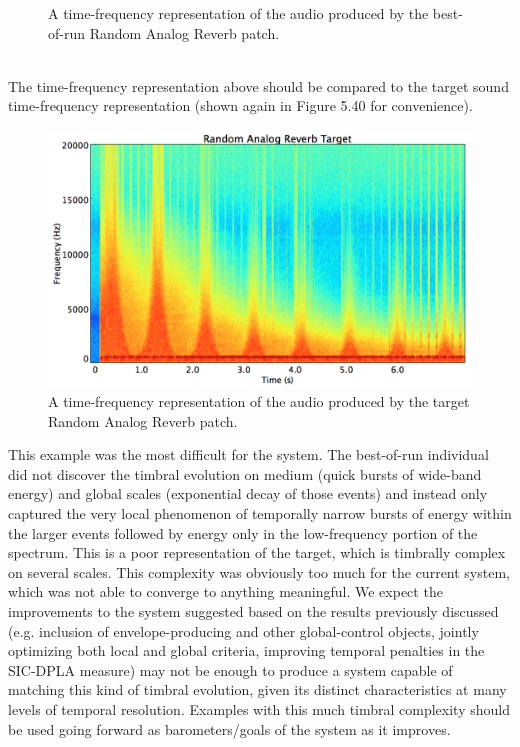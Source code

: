 \documentclass[12pt]{report} 	%
\numberwithin{figure}{chapter}
\numberwithin{table}{chapter}
\numberwithin{equation}{chapter}
\begin{document}
\begin{flushleft}
\begin{figure}[h!]
\begin{center}
\caption[Best-of-run random analog reverb time-frequency representation]{A time-frequency representation of the audio produced by the best-of-run Random Analog Reverb patch.}
\end{center}
\end{figure}
\\
The time-frequency representation above should be compared to the target sound time-frequency representation (shown again in Figure 5.40 for convenience).
\begin{figure}[h!]
\begin{center}
\includegraphics[scale=0.35,width=\linewidth]{RandomAnalogReverbTargetSTFT}
\caption[Target random analog reverb time-frequency representation]{A time-frequency representation of the audio produced by the target Random Analog Reverb patch.}
\end{center}
\end{figure}
This example was the most difficult for the system. The best-of-run individual did not discover the timbral evolution on medium (quick bursts of wide-band energy) and global scales (exponential decay of those events) and instead only captured the very local phenomenon of temporally narrow bursts of energy within the larger events followed by energy only in the low-frequency portion of the spectrum. This is a poor representation of the target, which is timbrally complex on several scales. This complexity was obviously too much for the current system, which was not able to converge to anything meaningful. We expect the improvements to the system suggested based on the results previously discussed (e.g. inclusion of envelope-producing and other global-control objects, jointly optimizing both local and global criteria, improving temporal penalties in the SIC-DPLA measure) may not be enough to produce a system capable of matching this kind of timbral evolution, given its distinct characteristics at many levels of temporal resolution. Examples with this much timbral complexity should be used going forward as barometers/goals of the system as it improves.


\end{flushleft}
\end{document}
